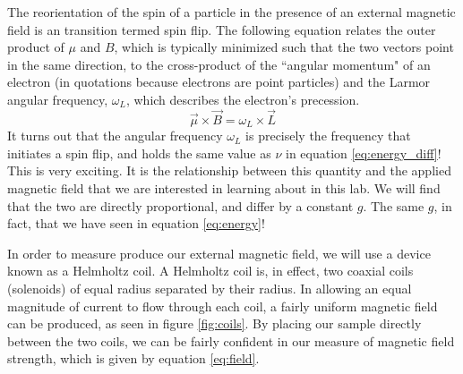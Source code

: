 \documentclass{amsart}
\begin{document}
The reorientation of the spin of a particle in the presence of an external magnetic field is an transition termed spin flip. The following equation relates the outer product of $\mu$ and $B$, which is typically minimized such that the two vectors point in the same direction, to the cross-product of the ``angular momentum"  of an electron (in quotations because electrons are point particles) and the Larmor angular frequency, $\omega_L$, which describes the electron's precession.
\begin{equation}
    \vec \mu \times \vec B = \omega_L \times \vec L
\end{equation}
It turns out that the angular frequency $\omega_L$ is precisely the frequency that initiates a spin flip, and holds the same value as $\nu$ in equation \ref{eq:energy_diff}! This is very exciting. It is the relationship between this quantity and the applied magnetic field that we are interested in learning about in this lab. We will find that the two are directly proportional, and differ by a constant $g$. The same $g$, in fact, that we have seen in equation \ref{eq:energy}!

In order to measure produce our external magnetic field, we will use a device known as a Helmholtz coil. A Helmholtz coil is, in effect, two coaxial coils (solenoids) of equal radius separated by their radius. In allowing an equal magnitude of current to flow through each coil, a fairly uniform magnetic field can be produced, as seen in figure \ref{fig:coils}. By placing our sample directly between the two coils, we can be fairly confident in our measure of magnetic field strength, which is given by equation \ref{eq:field}.
\end{document}
